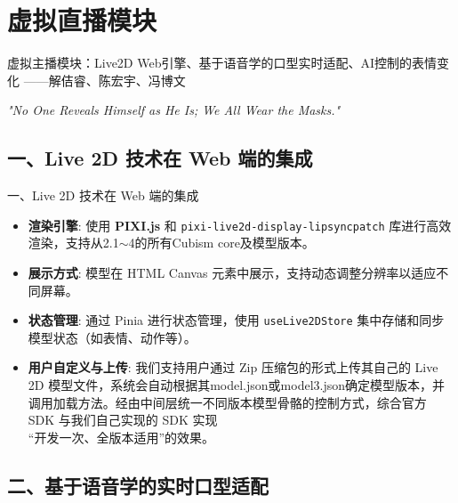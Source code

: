 \documentclass{beamer}
\begin{document}
\section{虚拟直播模块}

\begin {frame}{虚拟主播模块：Live2D Web引擎、基于语音学的口型实时适配、AI控制的表情变化
    \hfill ——解佶睿、陈宏宇、冯博文}

\centering
\textit{"No One Reveals Himself as He Is; We All Wear the Masks."} \\
\vspace {1em}
\end{frame}

\subsection{一、Live 2D 技术在 Web 端的集成}

\begin{frame}{一、Live 2D 技术在 Web 端的集成}
    \begin{itemize}
        \item \textbf{渲染引擎}: 使用 \textbf{PIXI.js} 和 \texttt{pixi-live2d-display-lipsyncpatch} 库进行高效渲染，支持从2.1$\sim$4的所有Cubism core及模型版本。
              \pause
        \item \textbf{展示方式}: 模型在 HTML Canvas 元素中展示，支持动态调整分辨率以适应不同屏幕。
              \pause
        \item \textbf{状态管理}: 通过 Pinia 进行状态管理，使用 \texttt{useLive2DStore} 集中存储和同步模型状态（如表情、动作等）。
              \pause
        \item \textbf{用户自定义与上传}: 我们支持用户通过 Zip 压缩包的形式上传其自己的 Live 2D 模型文件，系统会自动根据其model.json或model3.json确定模型版本，并调用加载方法。经由中间层统一不同版本模型骨骼的控制方式，综合官方 SDK 与我们自己实现的 SDK 实现 \\
              \centering
              “开发一次、全版本适用”的效果。
    \end{itemize}
\end{frame}


\subsection{二、基于语音学的实时口型适配}
\end{document}
